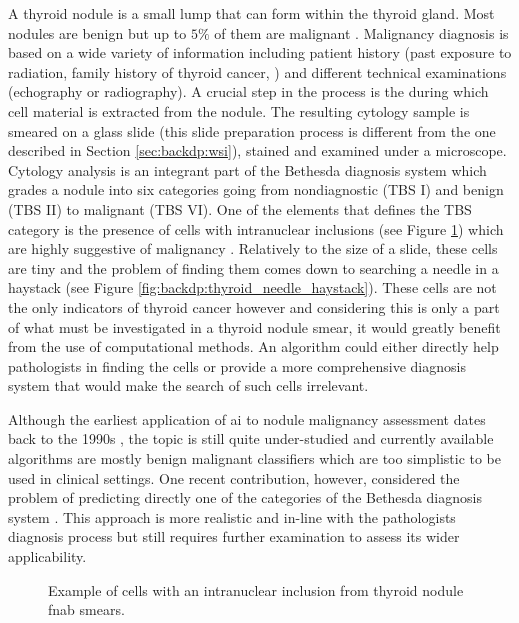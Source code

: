 A thyroid nodule is a small lump that can form within the thyroid gland. Most nodules are benign but up to $5\%$ of them are malignant \parencite{yeung2008management}. Malignancy diagnosis is based on a wide variety of information including patient history (past exposure to radiation, family history of thyroid cancer, \etc) and different technical examinations (\eg echography or radiography). A crucial step in the process is the  during which cell material is extracted from the nodule. The resulting cytology sample is smeared on a glass slide (this slide preparation process is different from the one described in Section \ref{sec:backdp:wsi}), stained and examined under a microscope. Cytology analysis is an integrant part of the Bethesda diagnosis system \parencite{bychkov2022bethesda} which grades a nodule into six categories going from nondiagnostic (TBS I) and benign (TBS II) to malignant (TBS VI). One of the elements that defines the TBS category is the presence of cells with intranuclear inclusions (see Figure \ref{fig:backdp:thyroid_inclusion}) which are highly suggestive of malignancy \parencite{arena2014intranuclear}. Relatively to the size of a slide, these cells are tiny and the problem of finding them comes down to searching a needle in a haystack (see Figure \ref{fig:backdp:thyroid_needle_haystack}). These cells are not the only indicators of thyroid cancer however and considering this is only a part of what must be investigated in a thyroid nodule smear, it would greatly benefit from the use of computational methods. An algorithm could either directly help pathologists in finding the cells or provide a more comprehensive diagnosis system that would make the search of such cells irrelevant. 

Although the earliest application of \acrlong{ai} to nodule malignancy assessment dates back to the 1990s \parencite{karakitsos1999learning}, the topic is still quite under-studied and currently available algorithms are mostly benign \vs malignant classifiers \parencite{kezlarian2021artificial} which are too simplistic to be used in clinical settings. One recent contribution, however, considered the problem of predicting directly one of the categories of the Bethesda diagnosis system \parencite{elliott2020application}. This approach is more realistic and in-line with the pathologists diagnosis process but still requires further examination to assess its wider applicability.

\begin{figure}
  \centering
  \hspace{0.2cm}
  \hspace{0.2cm}
  \hspace{0.2cm}
  \caption{Example of cells with an intranuclear inclusion from thyroid nodule \acrshort{fnab} smears.}
  \label{fig:backdp:thyroid_inclusion}
\end{figure}

